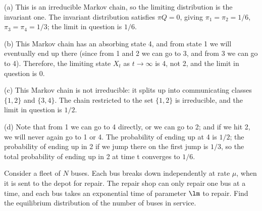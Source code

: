 \begin{solution}[\bf Solution.]
\ben
\item [(a)] This is an irreducible Markov chain, so the limiting distribution is the invariant one. The invariant distribution satisfies $\pi Q = 0$, giving $\pi_1 = \pi_2 = 1/6$, $\pi_3 = \pi_4 = 1/3$; the limit in question is $1/6$.
\item [(b)] This Markov chain has an absorbing state 4, and from state 1 we will eventually end up there (since from 1 and 2 we can go to 3, and from 3 we can go to 4). Therefore, the limiting state $X_t$ as $t\to\infty$ is 4, not 2, and the limit in question is 0.
\item [(c)] This Markov chain is not irreducible: it splits up into communicating classes $\{1, 2\}$ and $\{3, 4\}$. The chain restricted to the set $\{1, 2\}$ is irreducible, and the limit in question is $1/2$.
\item [(d)] Note that from 1 we can go to 4 directly, or we can go to 2; and if we hit 2, we will never again go to 1 or 4. The probability of ending up at 4 is $1/2$; the probability of ending up in 2 if we jump there on the first jump is $1/3$, so the total probability of ending up in 2 at time t converges to $1/6$.
\een
\end{solution}

\begin{problem}
 Consider a fleet of $N$ buses. Each bus breaks down independently at rate $\mu$, when it is sent to the depot for repair. The repair shop can only repair one bus at a time, and each bus takes an exponential time of parameter $\lm$ to repair. Find the equilibrium distribution of the number of buses in service.
\end{problem}

